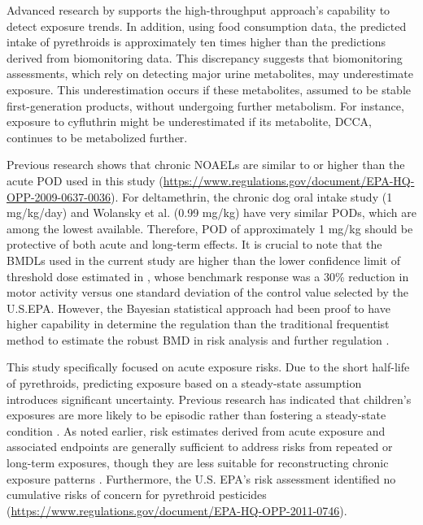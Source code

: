 \documentclass[toxics,article,submit,pdftex,moreauthors]{Definitions/mdpi}
\begin{document}
Advanced research by \citet{stanfield2024characterizing} supports the
high-throughput approach's capability to detect exposure trends. In
addition, using food consumption data, the predicted intake of
pyrethroids is approximately ten times higher than the predictions
derived from biomonitoring data. This discrepancy suggests that
biomonitoring assessments, which rely on detecting major urine
metabolites, may underestimate exposure. This underestimation occurs if
these metabolites, assumed to be stable first-generation products,
without undergoing further metabolism. For instance, exposure to
cyfluthrin might be underestimated if its metabolite, DCCA, continues to
be metabolized further.

Previous research shows that chronic NOAELs are similar to or higher
than the acute POD used in this study
(\url{https://www.regulations.gov/document/EPA-HQ-OPP-2009-0637-0036}).
For deltamethrin, the chronic dog oral intake study (1 mg/kg/day) and
Wolansky et al. \citep{wolansky_relative_2006} (0.99 mg/kg) have very
similar PODs, which are among the lowest available. Therefore, POD of
approximately 1 mg/kg should be protective of both acute and long-term
effects. It is crucial to note that the BMDLs used in the current study
are higher than the lower confidence limit of threshold dose estimated
in \citep{wolansky_relative_2006}, whose benchmark response was a 30\%
reduction in motor activity versus one standard deviation of the control
value selected by the U.S.EPA. However, the Bayesian statistical
approach had been proof to have higher capability in determine the
regulation than the traditional frequentist method to estimate the
robust BMD in risk analysis and further regulation
\citep{desai_role_2024}.

This study specifically focused on acute exposure risks. Due to the
short half-life of pyrethroids, predicting exposure based on a
steady-state assumption introduces significant uncertainty. Previous
research has indicated that children's exposures are more likely to be
episodic rather than fostering a steady-state condition
\citep{kissel_comparison_2005}. As noted earlier, risk estimates derived
from acute exposure and associated endpoints are generally sufficient to
address risks from repeated or long-term exposures, though they are less
suitable for reconstructing chronic exposure patterns
\citep{hays2007biomonitoring, aylward_interpreting_2012}. Furthermore,
the U.S. EPA's risk assessment identified no cumulative risks of concern
for pyrethroid pesticides
(\url{https://www.regulations.gov/document/EPA-HQ-OPP-2011-0746}).
\end{document}
